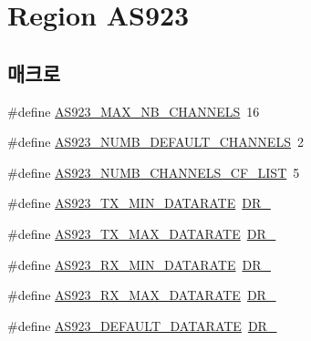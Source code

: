 \hypertarget{group___r_e_g_i_o_n_a_s923}{}\section{Region A\+S923}
\label{group___r_e_g_i_o_n_a_s923}
\subsection*{매크로}
\begin{DoxyCompactItemize}
\item 
\#define \mbox{\hyperlink{group___r_e_g_i_o_n_a_s923_ga02e3db7e4557dbf77db79285d38dc33e}{A\+S923\+\_\+\+M\+A\+X\+\_\+\+N\+B\+\_\+\+C\+H\+A\+N\+N\+E\+LS}}~16
\item 
\#define \mbox{\hyperlink{group___r_e_g_i_o_n_a_s923_ga189fa7f36943ed53424ac7610ef64d56}{A\+S923\+\_\+\+N\+U\+M\+B\+\_\+\+D\+E\+F\+A\+U\+L\+T\+\_\+\+C\+H\+A\+N\+N\+E\+LS}}~2
\item 
\#define \mbox{\hyperlink{group___r_e_g_i_o_n_a_s923_gaeb64b3a7da759d5e403f08bbacdb8cf8}{A\+S923\+\_\+\+N\+U\+M\+B\+\_\+\+C\+H\+A\+N\+N\+E\+L\+S\+\_\+\+C\+F\+\_\+\+L\+I\+ST}}~5
\item 
\#define \mbox{\hyperlink{group___r_e_g_i_o_n_a_s923_gab6f2badbf9a4eb4038301759c0f7fc77}{A\+S923\+\_\+\+T\+X\+\_\+\+M\+I\+N\+\_\+\+D\+A\+T\+A\+R\+A\+TE}}~\mbox{\hyperlink{group___r_e_g_i_o_n_ga6c4ef966b4f3d5eb7597b087f2b97095}{D\+R\+\_}}
\item 
\#define \mbox{\hyperlink{group___r_e_g_i_o_n_a_s923_gac9506097a516f03c7c86432d30e8f499}{A\+S923\+\_\+\+T\+X\+\_\+\+M\+A\+X\+\_\+\+D\+A\+T\+A\+R\+A\+TE}}~\mbox{\hyperlink{group___r_e_g_i_o_n_ga3a06805baf4f00911a3a5d3dbadebf61}{D\+R\+\_}}
\item 
\#define \mbox{\hyperlink{group___r_e_g_i_o_n_a_s923_ga55aa4a1054571ef315043248599e1c96}{A\+S923\+\_\+\+R\+X\+\_\+\+M\+I\+N\+\_\+\+D\+A\+T\+A\+R\+A\+TE}}~\mbox{\hyperlink{group___r_e_g_i_o_n_ga6c4ef966b4f3d5eb7597b087f2b97095}{D\+R\+\_}}
\item 
\#define \mbox{\hyperlink{group___r_e_g_i_o_n_a_s923_ga008298ea3d2b2444dcad3dedca7189bc}{A\+S923\+\_\+\+R\+X\+\_\+\+M\+A\+X\+\_\+\+D\+A\+T\+A\+R\+A\+TE}}~\mbox{\hyperlink{group___r_e_g_i_o_n_ga3a06805baf4f00911a3a5d3dbadebf61}{D\+R\+\_}}
\item 
\#define \mbox{\hyperlink{group___r_e_g_i_o_n_a_s923_ga643615d49b742b49b442da9803b9c291}{A\+S923\+\_\+\+D\+E\+F\+A\+U\+L\+T\+\_\+\+D\+A\+T\+A\+R\+A\+TE}}~\mbox{\hyperlink{group___r_e_g_i_o_n_gad402daa928a8b3dea829315fab69de17}{D\+R\+\_}}

\end{DoxyCompactItemize}
